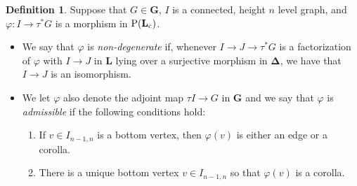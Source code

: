 \documentclass{amsart}
\numberwithin{theorem}{subsection}
\theoremstyle{definition}
\newtheorem{definition}[theorem]{Definition}
\newcommand{\Pre}{\name{P}}
\newcommand{\name}[1]{\ensuremath{\text{\textup{#1}}}}
\newcommand{\simp}{\mathbf{\Delta}}
\newcommand{\levelg}{\mathbf{L}}
\newcommand{\levelgconn}{\levelg_{\name{c}}}
\newcommand{\bbY}{\mathbf{G}}
\begin{document}
\begin{definition}
Suppose that $G\in\bbY$, $I$ is a connected, height $n$ level graph, and $\varphi \colon I \to \tau^{*}G$ is a morphism in $\Pre(\levelgconn)$.
\begin{itemize}
\item We say that $\varphi$ is \emph{non-degenerate} if, whenever $I \to J \to \tau^{*}G$ is a factorization of $\varphi$ with $I\to J$ in $\levelg$ lying over a surjective morphism in $\simp$, we have that $I\to J$ is an isomorphism.
\item We let $\varphi$ also denote the adjoint map $\tau I\to G$ in $\bbY$ and we say that $\varphi$ is \emph{admissible} if the following conditions hold:
\begin{enumerate}
\item If $v\in I_{n-1,n}$ is a bottom vertex, then $\varphi(v)$ is either an edge or a corolla.\label{enum where bottom layer goes}
\item There is a unique bottom vertex $v\in I_{n-1,n}$ so that $\varphi(v)$ is a corolla. \label{enum unique bottom}
\end{enumerate}
\end{itemize}
\end{definition}
\end{document}
